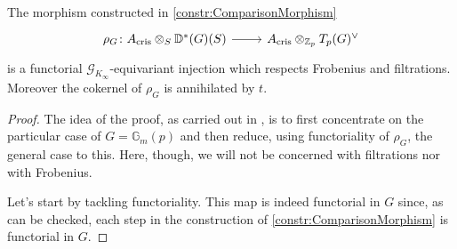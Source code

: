 \begin{thm}
	The morphism constructed in \cref{constr:ComparisonMorphism}
	\begin{equation*}
	\begin{tikzcd}[row sep = 0ex
		,/tikz/column 1/.append style={anchor=base east}
		,/tikz/column 2/.append style={anchor=base west}]
		\rho_G\colon A_{\mathrm{cris}} \otimes_S \mathbb{D}^*(G)(S) 
		\arrow[r, "", rightarrow] &
		A_{\mathrm{cris}} \otimes_{\mathbb{Z}_{p}} T_p(G)^\vee
	\end{tikzcd}
	\end{equation*} 
	is a functorial $\mathscr{G}_{K_\infty}$-equivariant injection 
	which respects Frobenius and filtrations.
	Moreover the cokernel of $\rho_G$ is annihilated by $t$.
\end{thm}
\begin{proof}
	The idea of the proof, as carried out in \cite[\S6]{Faltings},
	is to first concentrate on the particular case of $G = \mathbb{G}_m(p)$
	and then reduce, using functoriality of $\rho_G$, the general case to this.
	Here, though, we will not be concerned with filtrations nor with Frobenius.

	Let's start by tackling functoriality.
	This map is indeed functorial in $G$ since, as can be checked,
	each step in the construction of \cref{constr:ComparisonMorphism}
	is functorial in $G$.


\end{proof}
